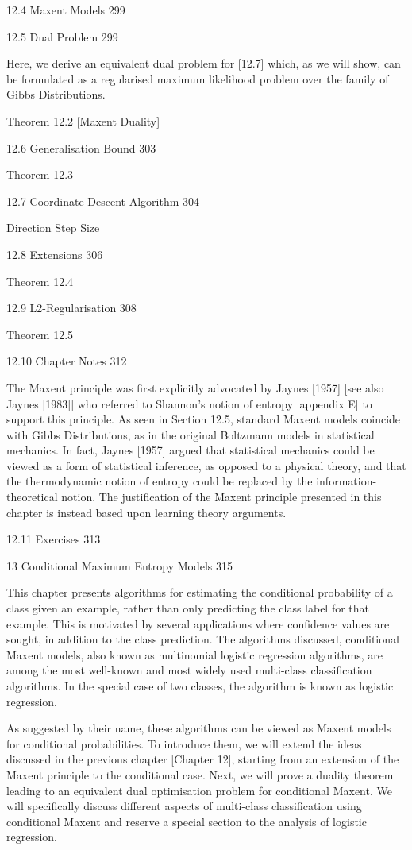 12.4 Maxent Models 299



12.5 Dual Problem 299

Here, we derive an equivalent dual problem for [12.7] which, as we will show, can be formulated as a regularised maximum likelihood problem over the family of Gibbs Distributions.

Theorem 12.2 [Maxent Duality]

12.6 Generalisation Bound 303

Theorem 12.3

12.7 Coordinate Descent Algorithm 304

Direction
Step Size

12.8 Extensions 306

Theorem 12.4

12.9 L2-Regularisation 308

Theorem 12.5

12.10 Chapter Notes 312

The Maxent principle was first explicitly advocated by Jaynes [1957] [see also Jaynes [1983]] who referred to Shannon's notion of entropy [appendix E] to support this principle. As seen in Section 12.5, standard Maxent models coincide with Gibbs Distributions, as in the original Boltzmann models in statistical mechanics. In fact, Jaynes [1957] argued that statistical mechanics could be viewed as a form of statistical inference, as opposed to a physical theory, and that the thermodynamic notion of entropy could be replaced by the information-theoretical notion. The justification of the Maxent principle presented in this chapter is instead based upon learning theory arguments.

12.11 Exercises 313



13 Conditional Maximum Entropy Models 315

This chapter presents algorithms for estimating the conditional probability of a class given an example, rather than only predicting the class label for that example. This is motivated by several applications where confidence values are sought, in addition to the class prediction. The algorithms discussed, conditional Maxent models, also known as multinomial logistic regression algorithms, are among the most well-known and most widely used multi-class classification algorithms. In the special case of two classes, the algorithm is known as logistic regression.

As suggested by their name, these algorithms can be viewed as Maxent models for conditional probabilities. To introduce them, we will extend the ideas discussed in the previous chapter [Chapter 12], starting from an extension of the Maxent principle to the conditional case. Next, we will prove a duality theorem leading to an equivalent dual optimisation problem for conditional Maxent. We will specifically discuss different aspects of multi-class classification using conditional Maxent and reserve a special section to the analysis of logistic regression.

